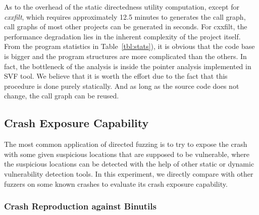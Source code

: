 As to the overhead of the static directedness utility computation, except for \emph{cxxfilt}, which requires approximately 12.5 minutes to generates the call graph, call graphs of most other projects can be generated in seconds. For cxxfilt, the performance degradation lies in the inherent complexity of the project itself. From the program statistics in Table~\ref{tbl:stats}), it is obvious that the code base is bigger and the program structures are more complicated than the others. In fact, the bottleneck of the analysis is inside the pointer analysis implemented in SVF tool. We believe that it is worth the effort due to the fact that this procedure is done purely statically. And as long as the source code does not change, the call graph can be reused.


%
 
\subsection{Crash Exposure Capability}\label{subsec:evalcrashrepro}

The most common application of directed fuzzing is to try to expose the crash with some given suspicious locations that are supposed to be vulnerable, where the suspicious locations can be detected with the help of other static or dynamic vulnerability detection tools.
In this experiment, we directly compare {\dFOT} with other fuzzers on some known crashes to evaluate its crash exposure capability.

\subsubsection{Crash Reproduction against Binutils}

